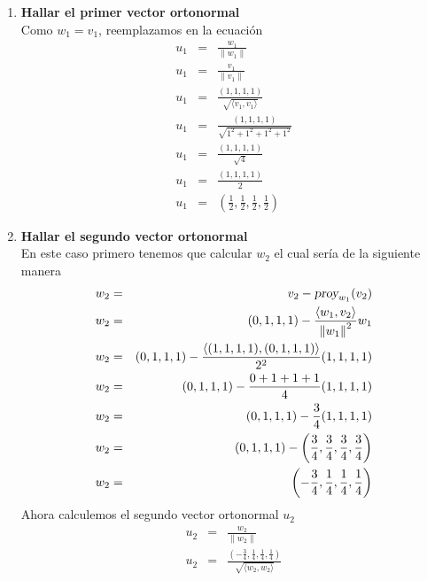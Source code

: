 \begin{enumerate}
    \item \textbf{Hallar el primer vector ortonormal}\\
    Como ${w}_{1} = {v}_{1}$, reemplazamos en la ecuación
    \begin{eqnarray}
        {u}_{1} &=& \frac{{w}_{1}}{\|{w}_{1} \|} \nonumber \\
        {u}_{1} &=& \frac{{v}_{1}}{\|{v}_{1} \|} \nonumber \\
        {u}_{1} &=& \frac{(1,1,1,1)}{\sqrt{\langle {v}_{1}, {v}_{1} \rangle}} \nonumber \\
        {u}_{1} &=& \frac{(1,1,1,1)}{\sqrt{{1}^{2}+{1}^{2}+{1}^{2}+{1}^{2}}} \nonumber \\
        {u}_{1} &=& \frac{(1,1,1,1)}{\sqrt{4}} \nonumber \\
        {u}_{1} &=& \frac{(1,1,1,1)}{2} \nonumber \\
        {u}_{1} &=& \left( \frac{1}{2}, \frac{1}{2}, \frac{1}{2}, \frac{1}{2} \right) \nonumber
    \end{eqnarray}
    \item \textbf{Hallar el segundo vector ortonormal}\\
    En este caso primero tenemos que calcular ${w}_{2}$ el cual sería de la siguiente manera
    \begin{eqnarray}
        {w}_{2} &=& {v}_{2} - {\textsl{proy}}_{{w}_{1}}({v}_{2}) \nonumber \\
        {w}_{2} &=& (0,1,1,1) - \frac{\langle {w}_{1}, {v}_{2} \rangle}{{\| {w}_{1} \|}^{2}} {w}_{1} \nonumber \\
        {w}_{2} &=& (0,1,1,1) - \frac{\langle (1,1,1,1), (0,1,1,1) \rangle}{{2}^{2}} (1,1,1,1) \nonumber \\
        {w}_{2} &=& (0,1,1,1) - \frac{0+1+1+1}{4} (1,1,1,1) \nonumber \\
        {w}_{2} &=& (0,1,1,1) - \frac{3}{4} (1,1,1,1) \nonumber \\
        {w}_{2} &=& (0,1,1,1) - \left( \frac{3}{4}, \frac{3}{4}, \frac{3}{4}, \frac{3}{4} \right)  \nonumber \\
        {w}_{2} &=& \left(- \frac{3}{4}, \frac{1}{4}, \frac{1}{4}, \frac{1}{4} \right) \nonumber
    \end{eqnarray}
    Ahora calculemos el segundo vector ortonormal ${u}_{2}$
    \begin{eqnarray}
        {u}_{2} &=& \frac{{w}_{2}}{\|{w}_{2} \|} \nonumber \\
        {u}_{2} &=& \frac{\left(- \frac{3}{4}, \frac{1}{4}, \frac{1}{4}, \frac{1}{4} \right)}{\sqrt{\langle {w}_{2}, {w}_{2} \rangle}} \nonumber \\

\end{eqnarray}
\end{enumerate}
